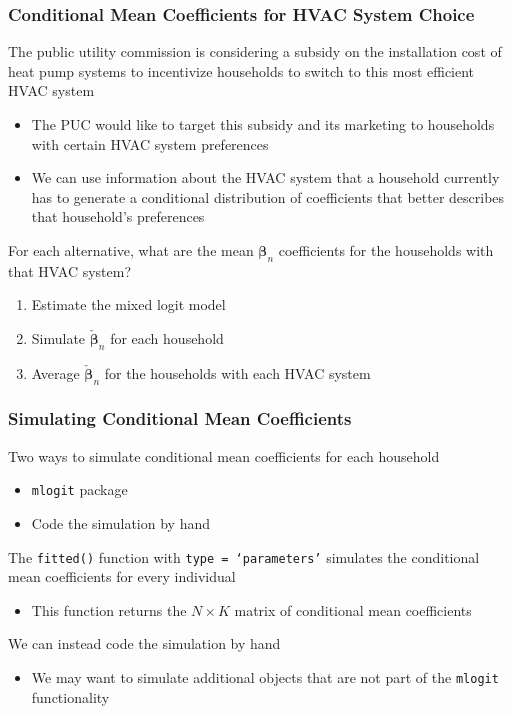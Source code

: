 \documentclass{beamer}\usepackage[]{graphicx}\usepackage[]{xcolor}
\begin{document}
\begin{frame}\frametitle{Conditional Mean Coefficients for HVAC System Choice}
    The public utility commission is considering a subsidy on the installation cost of heat pump systems to incentivize households to switch to this most efficient HVAC system
    \begin{itemize}
        \item The PUC would like to target this subsidy and its marketing to households with certain HVAC system preferences
        \item We can use information about the HVAC system that a household currently has to generate a conditional distribution of coefficients that better describes that household's preferences
    \end{itemize}
    \vspace{2ex}
    For each alternative, what are the mean $\bm{\beta}_n$ coefficients for the households with that HVAC system?
    \begin{enumerate}
        \item Estimate the mixed logit model
        \item Simulate $\check{\bm{\beta}}_n$ for each household
        \item Average $\check{\bm{\beta}}_n$ for the households with each HVAC system
    \end{enumerate}
\end{frame}

\begin{frame}\frametitle{Simulating Conditional Mean Coefficients}
    Two ways to simulate conditional mean coefficients for each household
    \begin{itemize}
        \item \texttt{mlogit} package
        \item Code the simulation by hand
    \end{itemize}
    \vspace{3ex}
    The \texttt{fitted()} function with \texttt{type = `parameters'} simulates the conditional mean coefficients for every individual
    \begin{itemize}
        \item This function returns the $N \times K$ matrix of conditional mean coefficients
    \end{itemize}
    \vspace{3ex}
    We can instead code the simulation by hand
    \begin{itemize}
        \item We may want to simulate additional objects that are not part of the \texttt{mlogit} functionality
    \end{itemize}
\end{frame}
\end{document}
